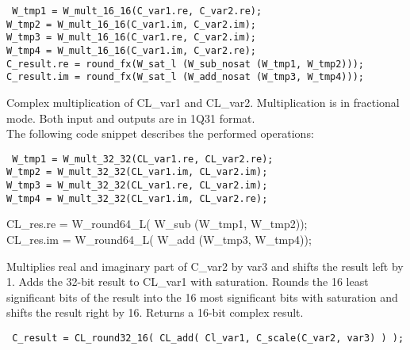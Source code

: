 {\tt {} W\_tmp1 = W\_mult\_16\_16(C\_var1.re, C\_var2.re);\\
      W\_tmp2 = W\_mult\_16\_16(C\_var1.im, C\_var2.im);\\
      W\_tmp3 = W\_mult\_16\_16(C\_var1.re, C\_var2.im);\\
      W\_tmp4 = W\_mult\_16\_16(C\_var1.im, C\_var2.re);\\

      C\_result.re = round\_fx(W\_sat\_l (W\_sub\_nosat (W\_tmp1, W\_tmp2)));\\
      C\_result.im = round\_fx(W\_sat\_l (W\_add\_nosat (W\_tmp3, W\_tmp4)));
}


Complex multiplication of CL\_var1 and CL\_var2.
Multiplication is in fractional mode. Both input and outputs are in 1Q31 format.\\
The following code snippet describes the performed operations:

{\tt {} W\_tmp1 = W\_mult\_32\_32(CL\_var1.re, CL\_var2.re);\\
      W\_tmp2 = W\_mult\_32\_32(CL\_var1.im, CL\_var2.im);\\
      W\_tmp3 = W\_mult\_32\_32(CL\_var1.re, CL\_var2.im);\\
      W\_tmp4 = W\_mult\_32\_32(CL\_var1.im, CL\_var2.re);

      CL\_res.re = W\_round64\_L( W\_sub (W\_tmp1, W\_tmp2));\\
      CL\_res.im = W\_round64\_L( W\_add (W\_tmp3, W\_tmp4));
}


Multiplies real and imaginary part of C\_var2 by var3 and shifts the result left by 1.
Adds the 32-bit result to CL\_var1 with saturation.
Rounds the 16 least significant bits of the result into the 16 most significant bits with saturation and shifts the result right by 16.
Returns a 16-bit complex result.

{\tt {} C\_result = CL\_round32\_16( CL\_add( Cl\_var1, C\_scale(C\_var2, var3) ) ); }


